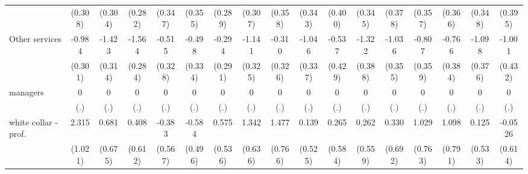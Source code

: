 {\begin{tabular}{l*{16}{c}}
                    &     (0.308)         &     (0.304)         &     (0.282)         &     (0.347)         &     (0.355)         &     (0.289)         &     (0.307)         &     (0.358)         &     (0.343)         &     (0.400)         &     (0.345)         &     (0.378)         &     (0.357)         &     (0.366)         &     (0.348)         &     (0.395)         \\
[1em]
Other services      &      -0.984\sym{**} &      -1.423\sym{***}&      -1.564\sym{***}&      -0.515         &      -0.498         &      -0.294         &      -1.141\sym{***}&      -0.310         &      -1.046\sym{**} &      -0.537         &      -1.322\sym{***}&      -1.036\sym{**} &      -0.807\sym{*}  &      -0.766\sym{*}  &      -1.098\sym{**} &      -1.001\sym{*}  \\
                    &     (0.301)         &     (0.314)         &     (0.284)         &     (0.328)         &     (0.334)         &     (0.291)         &     (0.325)         &     (0.326)         &     (0.337)         &     (0.429)         &     (0.388)         &     (0.355)         &     (0.359)         &     (0.384)         &     (0.376)         &     (0.432)         \\
[1em]
managers            &           0         &           0         &           0         &           0         &           0         &           0         &           0         &           0         &           0         &           0         &           0         &           0         &           0         &           0         &           0         &           0         \\
                    &         (.)         &         (.)         &         (.)         &         (.)         &         (.)         &         (.)         &         (.)         &         (.)         &         (.)         &         (.)         &         (.)         &         (.)         &         (.)         &         (.)         &         (.)         &         (.)         \\
[1em]
white collar - prof.&       2.315\sym{*}  &       0.681         &       0.408         &      -0.383         &      -0.584         &       0.575         &       1.342\sym{*}  &       1.477         &       0.139         &       0.265         &       0.262         &       0.330         &       1.029         &       1.098         &       0.125         &     -0.0526         \\
                    &     (1.021)         &     (0.675)         &     (0.612)         &     (0.567)         &     (0.496)         &     (0.536)         &     (0.636)         &     (0.766)         &     (0.525)         &     (0.584)         &     (0.559)         &     (0.692)         &     (0.763)         &     (0.791)         &     (0.533)         &     (0.614)         \\

\end{tabular}}
